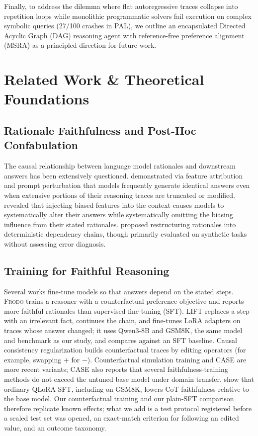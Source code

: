 \documentclass[11pt,a4paper]{article}
\begin{document}
Finally, to address the dilemma where flat autoregressive traces collapse into repetition loops while monolithic programmatic solvers fail execution on complex symbolic queries (27/100 crashes in PAL), we outline an encapsulated Directed Acyclic Graph (DAG) reasoning agent with reference-free preference alignment (MSRA) as a principled direction for future work.

\section{Related Work \& Theoretical Foundations}

\subsection{Rationale Faithfulness and Post-Hoc Confabulation}
The causal relationship between language model rationales and downstream answers has been extensively questioned. \citet{lanham2023measuring} demonstrated via feature attribution and prompt perturbation that models frequently generate identical answers even when extensive portions of their reasoning traces are truncated or modified. \citet{turpin2024language} revealed that injecting biased features into the context causes models to systematically alter their answers while systematically omitting the biasing influence from their stated rationales. \citet{lyu2023faithful} proposed restructuring rationales into deterministic dependency chains, though primarily evaluated on synthetic tasks without assessing error diagnosis.

\subsection{Training for Faithful Reasoning}
\label{subsec:faithfulness_training}
Several works fine-tune models so that answers depend on the stated steps. \textsc{Frodo} \citep{paul2024frodo} trains a reasoner with a counterfactual preference objective and reports more faithful rationales than supervised fine-tuning (SFT). \textsc{LIFT} \citep{swaroop2025lift} replaces a step with an irrelevant fact, continues the chain, and fine-tunes LoRA adapters on traces whose answer changed; it uses Qwen3-8B and GSM8K, the same model and benchmark as our study, and compares against an SFT baseline. Causal consistency regularization \citep{akter2025ccr} builds counterfactual traces by editing operators (for example, swapping $+$ for $-$). Counterfactual simulation training \citep{hase2026cst} and \textsc{CASE} \citep{wang2026case} are more recent variants; \textsc{CASE} also reports that several faithfulness-training methods do not exceed the untuned base model under domain transfer. \citet{lobo2024impact} show that ordinary QLoRA SFT, including on GSM8K, lowers CoT faithfulness relative to the base model. Our counterfactual training and our plain-SFT comparison therefore replicate known effects; what we add is a test protocol registered before a sealed test set was opened, an exact-match criterion for following an edited value, and an outcome taxonomy.
\end{document}
